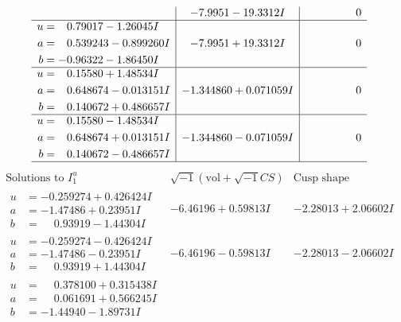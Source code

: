 \documentclass[1p]{elsarticle_modified}
\theoremstyle{definition}
\newcommand{\I}{\sqrt{-1}}
\begin{document}
$$\begin{array}{c|c|c}
 & -7.9951 - 19.3312 I & \phantom{-0.000000 } 0 \\ \hline\begin{aligned}
u &= \phantom{-}0.79017 - 1.26045 I \\
a &= \phantom{-}0.539243 - 0.899260 I \\
b &= -0.96322 - 1.86450 I\end{aligned}
 & -7.9951 + 19.3312 I & \phantom{-0.000000 } 0 \\ \hline\begin{aligned}
u &= \phantom{-}0.15580 + 1.48534 I \\
a &= \phantom{-}0.648674 - 0.013151 I \\
b &= \phantom{-}0.140672 + 0.486657 I\end{aligned}
 & -1.344860 + 0.071059 I & \phantom{-0.000000 } 0 \\ \hline\begin{aligned}
u &= \phantom{-}0.15580 - 1.48534 I \\
a &= \phantom{-}0.648674 + 0.013151 I \\
b &= \phantom{-}0.140672 - 0.486657 I\end{aligned}
 & -1.344860 - 0.071059 I & \phantom{-0.000000 } 0\\
 \hline 
 \end{array}$$\newpage$$\begin{array}{c|c|c}  
\text{Solutions to }I^u_{1}& \I (\text{vol} + \sqrt{-1}CS) & \text{Cusp shape}\\
 \hline 
\begin{aligned}
u &= -0.259274 + 0.426424 I \\
a &= -1.47486 + 0.23951 I \\
b &= \phantom{-}0.93919 - 1.44304 I\end{aligned}
 & -6.46196 + 0.59813 I & -2.28013 + 2.06602 I \\ \hline\begin{aligned}
u &= -0.259274 - 0.426424 I \\
a &= -1.47486 - 0.23951 I \\
b &= \phantom{-}0.93919 + 1.44304 I\end{aligned}
 & -6.46196 - 0.59813 I & -2.28013 - 2.06602 I \\ \hline\begin{aligned}
u &= \phantom{-}0.378100 + 0.315438 I \\
a &= \phantom{-}0.061691 + 0.566245 I \\
b &= -1.44940 - 1.89731 I\end{aligned}

\end{array}$$
\end{document}
